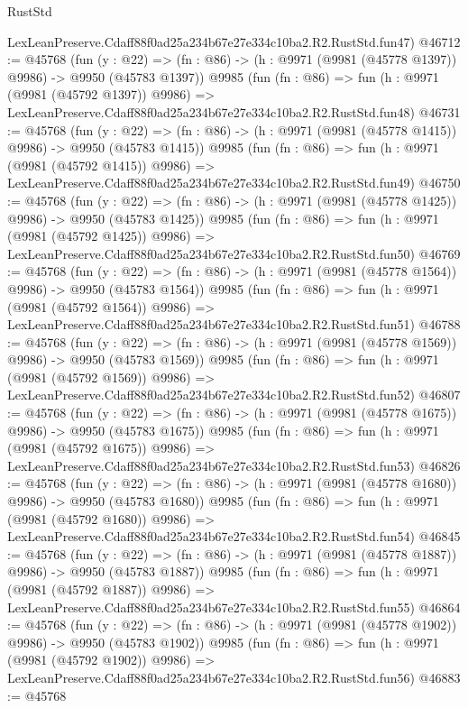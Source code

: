 \begin{lexlean}{RustStd}
\begin{coremodule}
    LexLeanPreserve.Cdaff88f0ad25a234b67e27e334c10ba2.R2.RustStd.fun47)
@46712 := @45768
    (fun (y : @22) =>
    (fn : @86) -> (h : @9971 (@9981 (@45778 @1397)) @9986) -> @9950 (@45783 @1397))
    @9985
    (fun (fn : @86) =>
    fun (h : @9971 (@9981 (@45792 @1397)) @9986) =>
    LexLeanPreserve.Cdaff88f0ad25a234b67e27e334c10ba2.R2.RustStd.fun48)
@46731 := @45768
    (fun (y : @22) =>
    (fn : @86) -> (h : @9971 (@9981 (@45778 @1415)) @9986) -> @9950 (@45783 @1415))
    @9985
    (fun (fn : @86) =>
    fun (h : @9971 (@9981 (@45792 @1415)) @9986) =>
    LexLeanPreserve.Cdaff88f0ad25a234b67e27e334c10ba2.R2.RustStd.fun49)
@46750 := @45768
    (fun (y : @22) =>
    (fn : @86) -> (h : @9971 (@9981 (@45778 @1425)) @9986) -> @9950 (@45783 @1425))
    @9985
    (fun (fn : @86) =>
    fun (h : @9971 (@9981 (@45792 @1425)) @9986) =>
    LexLeanPreserve.Cdaff88f0ad25a234b67e27e334c10ba2.R2.RustStd.fun50)
@46769 := @45768
    (fun (y : @22) =>
    (fn : @86) -> (h : @9971 (@9981 (@45778 @1564)) @9986) -> @9950 (@45783 @1564))
    @9985
    (fun (fn : @86) =>
    fun (h : @9971 (@9981 (@45792 @1564)) @9986) =>
    LexLeanPreserve.Cdaff88f0ad25a234b67e27e334c10ba2.R2.RustStd.fun51)
@46788 := @45768
    (fun (y : @22) =>
    (fn : @86) -> (h : @9971 (@9981 (@45778 @1569)) @9986) -> @9950 (@45783 @1569))
    @9985
    (fun (fn : @86) =>
    fun (h : @9971 (@9981 (@45792 @1569)) @9986) =>
    LexLeanPreserve.Cdaff88f0ad25a234b67e27e334c10ba2.R2.RustStd.fun52)
@46807 := @45768
    (fun (y : @22) =>
    (fn : @86) -> (h : @9971 (@9981 (@45778 @1675)) @9986) -> @9950 (@45783 @1675))
    @9985
    (fun (fn : @86) =>
    fun (h : @9971 (@9981 (@45792 @1675)) @9986) =>
    LexLeanPreserve.Cdaff88f0ad25a234b67e27e334c10ba2.R2.RustStd.fun53)
@46826 := @45768
    (fun (y : @22) =>
    (fn : @86) -> (h : @9971 (@9981 (@45778 @1680)) @9986) -> @9950 (@45783 @1680))
    @9985
    (fun (fn : @86) =>
    fun (h : @9971 (@9981 (@45792 @1680)) @9986) =>
    LexLeanPreserve.Cdaff88f0ad25a234b67e27e334c10ba2.R2.RustStd.fun54)
@46845 := @45768
    (fun (y : @22) =>
    (fn : @86) -> (h : @9971 (@9981 (@45778 @1887)) @9986) -> @9950 (@45783 @1887))
    @9985
    (fun (fn : @86) =>
    fun (h : @9971 (@9981 (@45792 @1887)) @9986) =>
    LexLeanPreserve.Cdaff88f0ad25a234b67e27e334c10ba2.R2.RustStd.fun55)
@46864 := @45768
    (fun (y : @22) =>
    (fn : @86) -> (h : @9971 (@9981 (@45778 @1902)) @9986) -> @9950 (@45783 @1902))
    @9985
    (fun (fn : @86) =>
    fun (h : @9971 (@9981 (@45792 @1902)) @9986) =>
    LexLeanPreserve.Cdaff88f0ad25a234b67e27e334c10ba2.R2.RustStd.fun56)
@46883 := @45768

\end{coremodule}
\end{lexlean}
